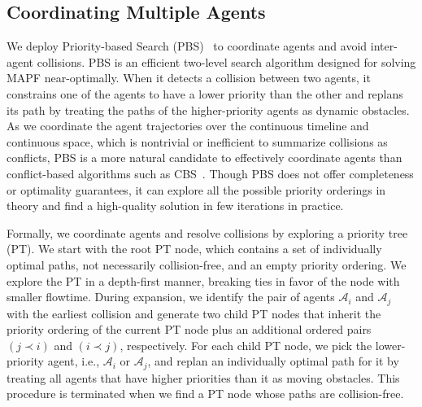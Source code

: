 \documentclass[letterpaper]{article} %
\theoremstyle{definition}
\newcommand{\norm}[1]{\left\lVert#1\right\rVert}
\begin{document}


\subsection{Coordinating Multiple Agents}\label{section:approach:pbs}

We deploy Priority-based Search (PBS)~\cite{ma2019searching} to coordinate agents and avoid inter-agent collisions. PBS is an efficient two-level search algorithm designed for solving MAPF near-optimally.
When it detects a collision between two agents, it constrains one of the agents to have a lower priority than the other and replans its path by treating the paths of the higher-priority agents as dynamic obstacles. 
As we coordinate the agent trajectories over the continuous timeline and continuous space, which is nontrivial or inefficient to summarize collisions as conflicts, PBS is a more natural candidate to effectively coordinate agents than conflict-based algorithms such as CBS~\cite{sharon2015conflict}. Though PBS does not offer completeness or optimality guarantees, it can explore all the possible priority orderings in theory and find a high-quality solution in few iterations in practice. 

Formally, we coordinate agents and resolve collisions by exploring a priority tree (PT). 
We start with the root PT node, which contains a set of individually optimal paths, not necessarily collision-free, and an empty priority ordering. 
We explore the PT in a depth-first manner, breaking ties in favor of the node with smaller flowtime. During expansion, we identify the pair of agents $\mathcal{A}_i$ and $\mathcal{A}_j$ with the earliest collision and generate two child PT nodes that inherit the priority ordering of the current PT node plus an additional ordered pairs $(j \prec i)$ and $(i \prec j)$, respectively. For each child PT node, we pick the lower-priority agent, i.e., $\mathcal{A}_i$ or $\mathcal{A}_j$, and replan an individually optimal path for it by treating all agents that have higher priorities than it as moving obstacles.
This procedure is terminated when we find a PT node whose paths are collision-free.
\end{document}
